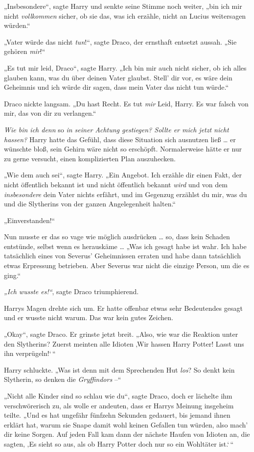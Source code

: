 {„Insbesondere“, sagte Harry und senkte seine Stimme noch weiter, „bin ich mir nicht \emph{vollkommen} sicher, ob sie das, was ich erzähle, nicht an Lucius weitersagen würden.“

„Vater würde das nicht \emph{tun}!“, sagte Draco, der ernsthaft entsetzt aussah. „Sie gehören \emph{mir}!“

„Es tut mir leid, Draco“, sagte Harry. „Ich bin mir auch nicht sicher, ob ich alles glauben kann, was du über deinen Vater glaubst. Stell' dir vor, es wäre dein Geheimnis und ich würde dir sagen, dass mein Vater das nicht tun würde.“

Draco nickte langsam. „Du hast Recht. Es tut \emph{mir} Leid, Harry. Es war falsch von mir, das von dir zu verlangen.“

\emph{Wie bin ich denn} so \emph{in seiner Achtung gestiegen? Sollte er mich jetzt nicht hassen?} Harry hatte das Gefühl, dass diese Situation sich ausnutzen ließ … er wünschte bloß, sein Gehirn wäre nicht so erschöpft. Normalerweise hätte er nur zu gerne versucht, einen komplizierten Plan auszuhecken.

„Wie dem auch sei“, sagte Harry. „Ein Angebot. Ich erzähle dir einen Fakt, der nicht öffentlich bekannt ist und nicht öffentlich bekannt \emph{wird} und von dem \emph{insbesondere} dein Vater nichts erfährt, und im Gegenzug erzählst du mir, was du und die Slytherins von der ganzen Angelegenheit halten.“

„Einverstanden!“

Nun musste er das so vage wie möglich ausdrücken … so, dass kein Schaden entstünde, selbst wenn es herauskäme … „Was ich gesagt habe ist wahr. Ich habe tatsächlich eines von Severus' Geheimnissen erraten und habe dann tatsächlich etwas Erpressung betrieben. Aber Severus war nicht die einzige Person, um die es ging.“

\emph{„Ich wusste es!“}, sagte Draco triumphierend.

Harrys Magen drehte sich um. Er hatte offenbar etwas sehr Bedeutendes gesagt und er wusste nicht warum. Das war kein gutes Zeichen.

„Okay“, sagte Draco. Er grinste jetzt breit. „Also, wie war die Reaktion unter den Slytherins? Zuerst meinten alle Idioten ‚Wir hassen Harry Potter! Lasst uns ihn verprügeln!`\,“

Harry schluckte. „Was ist denn mit dem Sprechenden Hut \emph{los}? So denkt kein Slytherin, so denken die \emph{Gryffindors} --“

„Nicht alle Kinder sind so schlau wie du“, sagte Draco, doch er lächelte ihm verschwörerisch zu, als wolle er andeuten, dass er Harrys Meinung insgeheim teilte. „Und es hat ungefähr fünfzehn Sekunden gedauert, bis jemand ihnen erklärt hat, warum sie Snape damit wohl keinen Gefallen tun würden, also mach' dir keine Sorgen. Auf jeden Fall kam dann der nächste Haufen von Idioten an, die sagten, ‚Es sieht so aus, als ob Harry Potter doch nur so ein Wohltäter ist.`\,“

}

